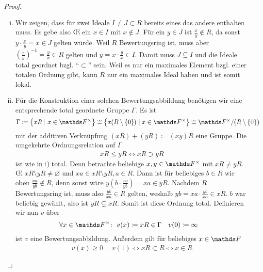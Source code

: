 \documentclass[ngerman,fontsize=11pt, paper=a4, parskip=half, titlepage=true, toc=bib]{scrartcl}
\begin{document}
\begin{Satz}
  \begin{proof}
    \begin{enumerate}[i)]
    \item Wir zeigen, dass für zwei Ideale $I\neq J\subset R$ bereits
      eines das andere enthalten muss. Es gebe also \OE{} ein $x\in I$
      mit $x\not\in J$. Für ein $y\in J$ ist $\frac{x}{y}\not\in R$,
      da sonst $y\cdot \frac{x}{y}=x\in J$ gelten würde.
      Weil $R$ Bewertungsring ist, muss aber
      $(\frac{x}{y})^{-1}=\frac{y}{x}\in R$ gelten und $y=x\cdot
      \frac{y}{x}\in I$. Damit muss $J\subsetneq I$ und die
      Ideale total geordnet bzgl. \enquote{$\subset$} sein.
      Weil es nur ein maximales Element bzgl. einer totalen Ordnung
      gibt, kann $R$ nur ein maximales Ideal haben und ist somit
      lokal.
    \item Für die Konstruktion einer solchen Bewertungsabbildung
      benötigen wir eine entsprechende total geordnete Gruppe $\Gamma$.
      Es ist
      \begin{gather*}
        \Gamma \coloneqq \left\{ xR \mid x\in \Fx \right\}
        \cong\left\{ x(R\setminus \{0\})\mid x\in\Fx \right\}
        \cong \Fx/(R\setminus \{0\})
      \end{gather*}
      mit der additiven Verknüpfung $(xR)+(yR)\coloneqq(xy)R$
      eine Gruppe. Die umgekehrte Ordnungsrelation
      auf $\Gamma$
      \begin{gather*}
        xR\leq yR \Longleftrightarrow xR \supset yR
      \end{gather*}
      ist wie in i) total.
      Denn betrachte beliebige $x,y\in\Fx$ mit $xR\neq yR$.
      \OE{} $xR\setminus yR\neq \varnothing$ und $xa\in xR\setminus yR,
      a \in R$. Dann ist für beliebiges $b\in R$ wie oben 
      $\frac{xa}{yb}\not\in R$, denn sonst wäre 
      $y(b\cdot\frac{xa}{yb})=xa \in yR$.
      Nachdem $R$ Bewertungsring ist, muss also $\frac{yb}{xa}\in R$
      gelten, weshalb $yb=xa\cdot \frac{yb}{xa}\in xR$. $b$ war beliebig
      gewählt, also ist $yR\subsetneq xR$.
      Somit ist diese Ordnung total.
      Definieren wir nun $v$ über
      \begin{align*}
        \forall x\in \Fx\colon\;v(x)&\coloneqq xR\in\Gamma
        &v(0)&\coloneqq \infty
      \end{align*}
      ist $v$ eine Bewertungsabbildung. 
      Außerdem gilt für beliebiges $x\in\F$ 
      \begin{gather*}
        v(x)\geq 0=v(1)
        \Leftrightarrow xR \subset R 
        \Leftrightarrow x\in R
      \end{gather*}

\end{enumerate}
\end{proof}
\end{Satz}
\end{document}
